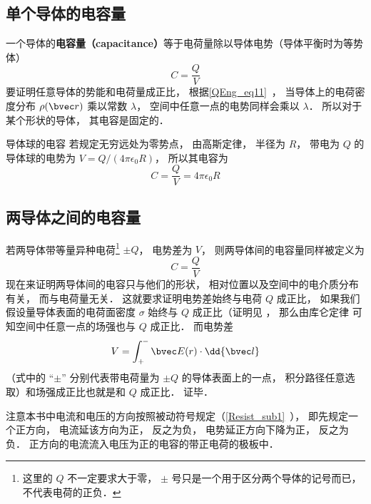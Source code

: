 

\subsection{单个导体的电容量}

一个导体的\textbf{电容量（capacitance）}等于电荷量除以导体电势（导体平衡时为等势体）
\begin{equation}\label{Cpctor_eq2}
C = \frac{Q}{V}
\end{equation}
要证明任意导体的势能和电荷量成正比， 根据\autoref{QEng_eq11}~， 当导体上的电荷密度分布 $\rho(\bvec r)$ 乘以常数 $\lambda$， 空间中任意一点的电势同样会乘以 $\lambda$． 所以对于某个形状的导体， 其电容是固定的．

\begin{example}{导体球的电容}\label{Cpctor_ex1}
若规定无穷远处为零势点， 由高斯定律， 半径为 $R$， 带电为 $Q$ 的导体球的电势为 $V = Q/(4\pi\epsilon_0 R)$， 所以其电容为
\begin{equation}\label{Cpctor_eq1}
C = \frac{Q}{V} = 4\pi\epsilon_0 R
\end{equation}
\end{example}

\subsection{两导体之间的电容量}
若两导体带等量异种电荷\footnote{这里的 $Q$ 不一定要求大于零， $\pm$ 号只是一个用于区分两个导体的记号而已， 不代表电荷的正负．} $\pm Q$， 电势差为 $V$， 则两导体间的电容量同样被定义为
\begin{equation}
C = \frac{Q}{V}
\end{equation}
现在来证明两导体间的电容只与他们的形状， 相对位置以及空间中的电介质分布有关， 而与电荷量无关． 这就要求证明电势差始终与电荷 $Q$ 成正比， 如果我们假设量导体表面的电荷面密度 $\sigma$ 始终与 $Q$ 成正比（证明见%
， 那么由库仑定律%
可知空间中任意一点的场强也与 $Q$ 成正比． 而电势差
\begin{equation}
V = \int_+^- \bvec E(r) \cdot \dd{\bvec l}
\end{equation}
（式中的 “$\pm$” 分别代表带电荷量为 $\pm Q$ 的导体表面上的一点， 积分路径任意选取）和场强成正比也就是和 $Q$ 成正比． 证毕．

注意本书中电流和电压的方向按照被动符号规定（\autoref{Resist_sub1}~）， 即先规定一个正方向， 电流延该方向为正， 反之为负， 电势延正方向下降为正， 反之为负． 正方向的电流流入电压为正的电容的带正电荷的极板中．


